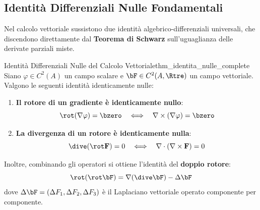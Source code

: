\subsection{Identit\`a Differenziali Nulle Fondamentali}

Nel calcolo vettoriale sussistono due identità algebrico-differenziali universali, che discendono direttamente dal \textbf{Teorema di Schwarz} sull'uguaglianza delle derivate parziali miste.

\begin{teorema}{Identità Differenziali Nulle del Calcolo Vettoriale}{thm_identita_nulle_complete}
Siano $\varphi \in C^2(A)$ un campo scalare e $\bF \in C^2(A, \Rtre)$ un campo vettoriale. Valgono le seguenti identità identicamente nulle:
\begin{enumerate}
    \item \textbf{Il rotore di un gradiente è identicamente nullo}:
    \[
    \rot(\nabla \varphi) = \bzero \quad \Longleftrightarrow \quad \nabla \times (\nabla \varphi) = \bzero
    \]
    \item \textbf{La divergenza di un rotore è identicamente nulla}:
    \[
    \dive(\rot \mathbf{F}) = 0 \quad \Longleftrightarrow \quad \nabla \cdot (\nabla \times \mathbf{F}) = 0
    \]
\end{enumerate}
Inoltre, combinando gli operatori si ottiene l'identità del \textbf{doppio rotore}:
\[
\rot(\rot \bF) = \nabla(\dive \bF) - \Delta \bF
\]
dove $\Delta \bF = (\Delta F_1, \Delta F_2, \Delta F_3)$ è il Laplaciano vettoriale operato componente per componente.
\end{teorema}

